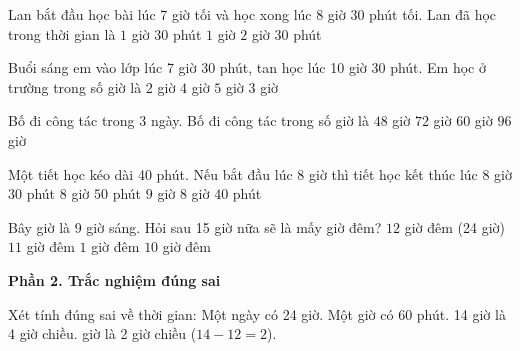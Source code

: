 \begin{ex} %
Lan bắt đầu học bài lúc 7 giờ tối và học xong lúc 8 giờ 30 phút tối. Lan đã học trong thời gian là
\choice
{\True $1$ giờ $30$ phút}
{$1$ giờ}
{$2$ giờ}
{$30$ phút}
\end{ex}

\begin{ex} %
Buổi sáng em vào lớp lúc 7 giờ 30 phút, tan học lúc 10 giờ 30 phút. Em học ở trường trong số giờ là
\choice
{$2$ giờ}
{$4$ giờ}
{$5$ giờ}
{\True $3$ giờ}
\end{ex}

\begin{ex} %
Bố đi công tác trong 3 ngày. Bố đi công tác trong số giờ là
\choice
{$48$ giờ}
{\True $72$ giờ}
{$60$ giờ}
{$96$ giờ}
\end{ex}

\begin{ex} %
Một tiết học kéo dài 40 phút. Nếu bắt đầu lúc 8 giờ thì tiết học kết thúc lúc
\choice
{$8$ giờ $30$ phút}
{$8$ giờ $50$ phút}
{$9$ giờ}
{\True $8$ giờ $40$ phút}
\end{ex}

\begin{ex} %
Bây giờ là 9 giờ sáng. Hỏi sau 15 giờ nữa sẽ là mấy giờ đêm?
\choice
{\True $12$ giờ đêm (24 giờ)}
{$11$ giờ đêm}
{$1$ giờ đêm}
{$10$ giờ đêm}
\end{ex}

\textbf{Phần 2. Trắc nghiệm đúng sai}

\begin{ex} %
Xét tính đúng sai về thời gian:
\choiceTF
{\True Một ngày có 24 giờ.}
{\True Một giờ có 60 phút.}
{14 giờ là 4 giờ chiều.}
{ giờ là 2 giờ chiều ($14 - 12 = 2$).}
\end{ex}

